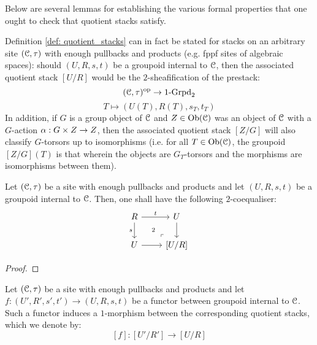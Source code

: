             Below are several lemmas for establishing the various formal properties that one ought to check that quotient stacks satisfy. 
            \begin{remark} \label{remark: quotient_stacks_over_general_sites}
                Definition \ref{def: quotient_stacks} can in fact be stated for stacks on an arbitrary site $(\mathcal{C}, \tau)$ with enough pullbacks and products (e.g. fppf sites of algebraic spaces): should $(U, R, s, t)$ be a groupoid internal to $\mathcal{C}$, then the associated quotient stack $[U/R]$ would be the $2$-sheafification of the prestack:
                    $$(\mathcal{C}, \tau)^{\mathrm{op}} \to 1\text{-}\mathrm{Grpd}_2$$
                    $$T \mapsto (U(T), R(T), s_T, t_T)$$
                In addition, if $G$ is a group object of $\mathcal{C}$ and $Z \in \mathrm{Ob}(\mathcal{C})$ was an object of $\mathcal{C}$ with a $G$-action $\alpha: G \x Z \to Z$, then the associated quotient stack $[Z/G]$ will also classify $G$-torsors up to isomorphisms (i.e. for all $T \in \mathrm{Ob}(\mathcal{C})$, the groupoid $[Z/G](T)$ is that wherein the objects are $G_T$-torsors and the morphisms are isomorphisms between them).
            \end{remark}
            \begin{lemma} \label{lemma: universal_property_of_quotient_stacks}
                Let $(\mathcal{C}, \tau)$ be a site with enough pullbacks and products and let $(U, R, s, t)$ be a groupoid internal to $\mathcal{C}$. Then, one shall have the following $2$-coequaliser:
                    $$
                        \begin{tikzcd}
                        	R & U \\
                        	U & {[U/R]}
                        	\arrow["s"', from=1-1, to=2-1]
                        	\arrow["2"{description}, "\lrcorner"{anchor=center, pos=0.125, rotate=180}, draw=none, from=2-2, to=1-1]
                        	\arrow[from=2-1, to=2-2]
                        	\arrow[from=1-2, to=2-2]
                        	\arrow["t", from=1-1, to=1-2]
                        \end{tikzcd}
                    $$
            \end{lemma}
                \begin{proof}
                    
                \end{proof}
            \begin{lemma} \label{lemma: functoriality_of_quotient_stacks}
                Let $(\mathcal{C}, \tau)$ be a site with enough pullbacks and products and let $f: (U', R', s', t') \to (U, R, s, t)$ be a functor between groupoid internal to $\mathcal{C}$. Such a functor induces a $1$-morphism between the corresponding quotient stacks, which we denote by:
                    $$[f]: [U'/R'] \to [U/R]$$
            \end{lemma}
